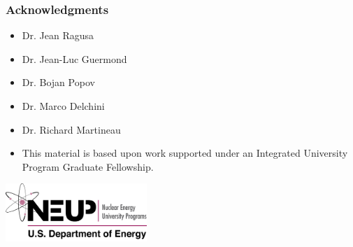 \begin{frame}
\frametitle{Acknowledgments}

\begin{itemize}
   \item Dr. Jean Ragusa
   \item Dr. Jean-Luc Guermond
   \item Dr. Bojan Popov
   \item Dr. Marco Delchini
   \item Dr. Richard Martineau
\end{itemize}
\begin{itemize}
   \item This material is based upon work supported under an Integrated University
      Program Graduate Fellowship.
\end{itemize}

\begin{center}
   \includegraphics[width=0.4\textwidth]{./figures/NEUP_Final_Logo_Version-09.jpg}
\end{center}
\end{frame}
